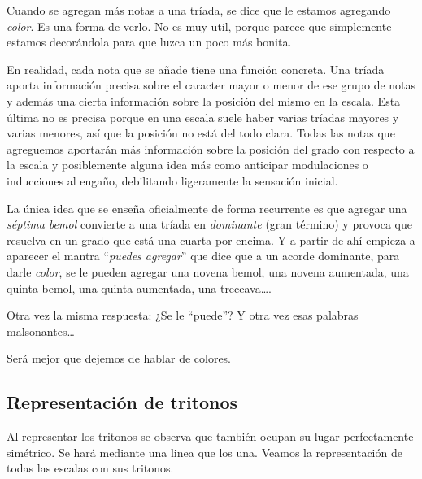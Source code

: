 \documentclass[]{article}
\begin{document}
Cuando se agregan más notas a una tríada, se dice que le estamos agregando \emph{color}. Es una forma de verlo. No es muy util, porque parece que simplemente estamos decorándola para que luzca un poco más bonita.

En realidad, cada nota que se añade tiene una función concreta. Una tríada aporta información precisa sobre el caracter mayor o menor de ese grupo de notas y además una cierta información sobre la posición del mismo en la escala. Esta última no es precisa porque en una escala suele haber varias tríadas mayores y varias menores, así que la posición no está del todo clara. Todas las notas que agreguemos aportarán más información sobre la posición del grado con respecto a la escala y posiblemente alguna idea más como anticipar modulaciones o inducciones al engaño, debilitando ligeramente la sensación inicial.

La única idea que se enseña oficialmente de forma recurrente es que agregar una \emph{séptima bemol} convierte a una tríada en \emph{dominante} (gran término) y provoca que resuelva en un grado que está una cuarta por encima. Y a partir de ahí empieza a aparecer el mantra ``\emph{puedes agregar}'' que dice que a un acorde dominante, para darle \emph{color}, se le pueden agregar una novena bemol, una novena aumentada, una quinta bemol, una quinta aumentada, una treceava\ldots.

Otra vez la misma respuesta: ¿Se le ``puede''? Y otra vez esas palabras malsonantes\ldots{}

Será mejor que dejemos de hablar de colores.

\subsection{Representación de tritonos}

Al representar los tritonos se observa que también ocupan su lugar perfectamente simétrico. Se hará mediante una linea que los una. Veamos la representación de todas las escalas con sus tritonos.
\end{document}
